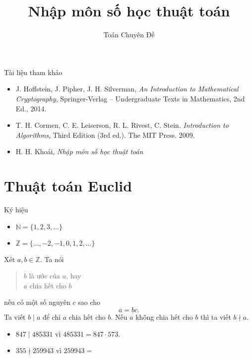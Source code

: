 
\title{Nhập môn số học thuật toán} 
 \author{Toán Chuyên Đề}   
    
\maketitle    

\begin{frame}{Tài liệu tham khảo}
  \begin{itemize}
  \item J. Hoffstein, J. Pipher, J. H. Silverman,
    \textit{An Introduction to Mathematical Cryptography},
    Springer-Verlag – Undergraduate Texts in Mathematics, 2nd Ed.,
    2014.
  \item T. H. Cormen, C. E. Leiserson, R. L. Rivest, C. Stein.  \textit{Introduction to Algorithms}, Third Edition (3rd ed.). The MIT Press. 2009.

  \item H. H. Khoái, \textit{Nhập môn số học thuật toán}
  \end{itemize}
\end{frame}

\section{Thuật toán Euclid}
\begin{frame}{Ký hiệu}
	\begin{itemize}
		\item $\mathbb{N} = \{1,2,3, \dots\}$
		\item $\mathbb{Z} = \{\dots,-2,-1,0,1, 2, \dots\}$
	\end{itemize}
\end{frame}

\begin{frame}%
  \begin{dfntn}
    Xét $a,b \in \mathbb{Z}$. Ta nói 
    \begin{quotation}
      $b$ là ước của $a$, hay \\
      $a$ chia hết cho $b$
    \end{quotation}
nếu có một số nguyên $c$ sao cho $$a = bc.$$
Ta viết  $b\mid a $ để chỉ $a$ chia hết cho $b$. Nếu $a$ không chia hết cho $b$ thì ta viết $b \nmid a$.
  \end{dfntn}
\pause 
  \begin{xmpl}
    \begin{itemize}
    \item $847 \mid 485331$ vì $485331 = 847 \cdot 573$.
    \item $355 \nmid 259943$ vì $259943 = $ 
    \end{itemize}
  \end{xmpl}
\end{frame}

